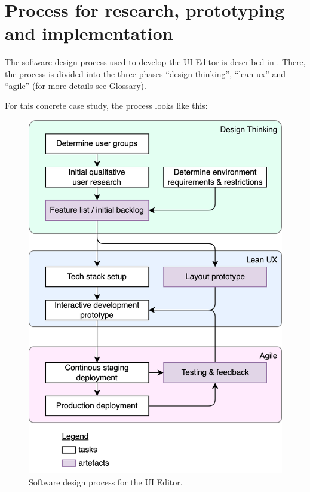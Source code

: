 \newpage
\section{Process for research, prototyping and implementation}

The software design process used to develop the UI Editor is described in \cite[p. 104]{LearnHCI:2020ys}.
There, the process is divided into the three phases ``\Gls{design-thinking}'', ``\Gls{lean-ux}'' and ``\Gls{agile}'' (for more details see Glossary).

For this concrete case study, the process looks like this:
\begin{figure}[h]
  \centering
  \includegraphics[width=0.8\linewidth]{pics/process.drawio.png}
  \caption{Software design process for the UI Editor.}
	\label{fig:process}
\end{figure}

